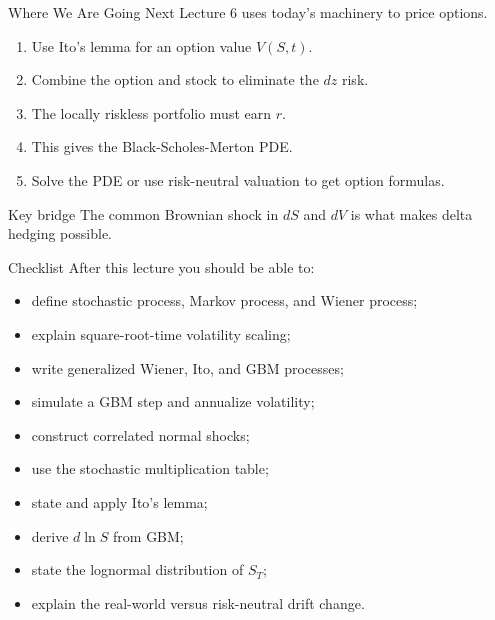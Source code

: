 \documentclass[aspectratio=169,11pt]{beamer}
\newcommand{\Ito}{Ito}
\begin{document}
\begin{frame}{Where We Are Going Next}
    Lecture 6 uses today's machinery to price options.

    \begin{enumerate}
        \item Use \Ito's lemma for an option value \(V(S,t)\).
        \item Combine the option and stock to eliminate the \(dz\) risk.
        \item The locally riskless portfolio must earn \(r\).
        \item This gives the Black-Scholes-Merton PDE.
        \item Solve the PDE or use risk-neutral valuation to get option formulas.
    \end{enumerate}

    \begin{block}{Key bridge}
        The common Brownian shock in \(dS\) and \(dV\) is what makes delta hedging possible.
    \end{block}
\end{frame}

\begin{frame}{Checklist}
    After this lecture you should be able to:
    \begin{itemize}
        \item define stochastic process, Markov process, and Wiener process;
        \item explain square-root-time volatility scaling;
        \item write generalized Wiener, \Ito, and GBM processes;
        \item simulate a GBM step and annualize volatility;
        \item construct correlated normal shocks;
        \item use the stochastic multiplication table;
        \item state and apply \Ito's lemma;
        \item derive \(d\ln S\) from GBM;
        \item state the lognormal distribution of \(S_T\);
        \item explain the real-world versus risk-neutral drift change.
    \end{itemize}
\end{frame}
\end{document}
